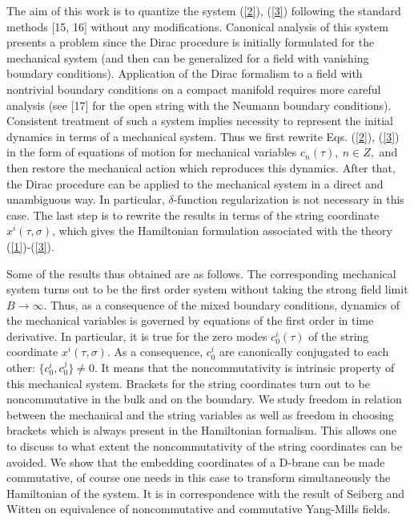 \documentclass[a4paper]{article}
\begin{document}
The aim of this work is to quantize the system (\ref{2}), (\ref{3})
following the standard methods [15, 16] without any modifications.
Canonical analysis of this system presents a problem
since the Dirac procedure is initially formulated for the mechanical
system (and then can be generalized for a field with vanishing boundary
conditions). Application of the Dirac formalism to a field with nontrivial
boundary conditions on a compact manifold requires more careful analysis
(see [17] for the open string with the Neumann boundary conditions).
Consistent treatment of such a system implies necessity to represent
the initial dynamics in terms of a mechanical system. Thus we first
rewrite Eqs. (\ref{2}), (\ref{3}) in the form of equations of motion for
mechanical variables $c_n(\tau), ~ n\in Z,$ and then restore the 
mechanical action
which reproduces this dynamics. After that, the Dirac procedure can be
applied to the mechanical system in a direct and unambiguous way. In
particular, $\delta$-function regularization is not necessary in this
case. The last step is to rewrite the results in terms of the string
coordinate $x^i(\tau, \sigma)$, which gives the Hamiltonian formulation 
associated with the theory (\ref{1})-(\ref{3}).

Some of the results thus obtained are as follows.
The corresponding mechanical system 
turns out to be the first order system without taking the
strong field limit $B\longrightarrow\infty$. 
Thus, as a consequence of the mixed boundary conditions, dynamics of 
the mechanical variables is
governed by equations of the first order in time derivative. In
particular,
it is true for the zero modes $c_0^i(\tau)$ of the string coordinate
$x^i(\tau, \sigma)$. As a consequence, $c_0^i$ are canonically conjugated
to each other: $\{c_0^i, c_0^j\}\ne 0$. It means that the noncommutativity
is intrinsic property of this mechanical system. Brackets for the string
coordinates turn out to be noncommutative in the bulk and on the boundary.
We study freedom in relation between the mechanical and the string
variables as well as freedom in choosing brackets which is always
present in the Hamiltonian formalism. This allows one to discuss to what
extent the noncommutativity of the string coordinates can be avoided.
We show that the embedding coordinates of a D-brane can be made
commutative, of course one needs in this case to transform 
simultaneously the Hamiltonian of the system. 
It is in correspondence with the result of Seiberg and Witten on
equivalence of noncommutative and commutative Yang-Mills fields.
\end{document}
